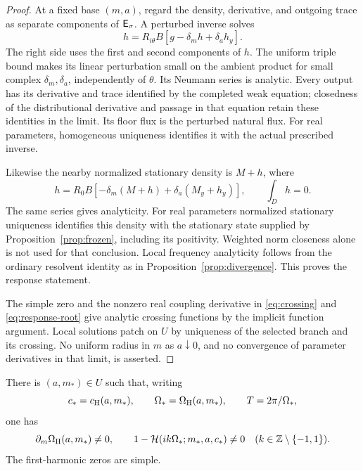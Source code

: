 \begin{proof}
At a fixed base $(m,a)$, regard the density, derivative, and outgoing
trace as separate components of $\mathsf E_\sigma$. A perturbed inverse solves
\begin{equation}\label{eq:parameter-inverse}
 h=R_{i\theta}B[g-\delta_m h+\delta_a h_y].
\end{equation}
The right side uses the first and second components of $h$. The
uniform triple bound makes its linear perturbation small on the
ambient product for small complex $\delta_m,\delta_a$, independently
of $\theta$. Its Neumann series is analytic. Every output has its
derivative and trace identified by the completed weak equation;
closedness of the distributional derivative and passage in that
equation retain these identities in the limit. Its floor flux is
the perturbed natural flux. For real parameters, homogeneous
uniqueness identifies it with the actual prescribed inverse.

Likewise the nearby normalized stationary density is $M+h$, where
\begin{equation}\label{eq:parameter-stationary}
 h=R_0B[-\delta_m(M+h)+\delta_a(M_y+h_y)],\qquad \int_Dh=0.
\end{equation}
The same series gives analyticity. For real parameters normalized
stationary uniqueness identifies this density with the stationary
state supplied by Proposition~\ref{prop:frozen}, including its
positivity. Weighted norm closeness alone is not used for that
conclusion. Local frequency analyticity follows from the ordinary
resolvent identity as in Proposition~\ref{prop:divergence}. This
proves the response statement.

The simple zero and the nonzero real coupling derivative in
\eqref{eq:crossing} and \eqref{eq:response-root} give analytic crossing
functions by the implicit function argument. Local solutions patch
on $U$ by uniqueness of the selected branch and its crossing.
No uniform radius in $m$ as $a\downarrow0$, and no convergence of
parameter derivatives in that limit, is asserted.
\end{proof}

\begin{lemma}\label{lem:selection}
There is $(a,m_*)\in U$ such that, writing
\[
 c_*=c_{\mathrm H}(a,m_*),\qquad \Omega_*=\Omega_{\mathrm H}(a,m_*),\qquad T=2\pi/\Omega_*,
\]
one has
\begin{equation}\label{eq:nonresonance}
 \partial_m\Omega_{\mathrm H}(a,m_*)\ne0,\qquad
 1-\mathcal H(ik\Omega_*;m_*,a,c_*)\ne0
                         \quad(k\in\mathbb Z\setminus\{-1,1\}).
\end{equation}
The first-harmonic zeros are simple.
\end{lemma}

